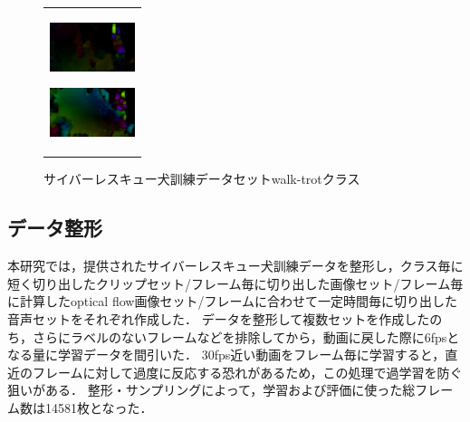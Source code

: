 \begin{enumerate}
\begin{end}
\begin{figure}[H]
\begin{tabular}{l}
\begin{minipage}{0.165\hsize}
\begin{center}
          \includegraphics[clip, width=2.5cm]{./Figures/optic_walk4.eps}
          \hspace{0.1cm} { }
        \end{center}
      \end{minipage}
      \begin{minipage}{0.165\hsize}
        \begin{center}
          \includegraphics[clip, width=2.5cm]{./Figures/optic_walk5.eps}
          \hspace{2.2cm} { }
        \end{center}
      \end{minipage}
\\ %
    \end{tabular}
    \caption{サイバーレスキュー犬訓練データセットwalk-trotクラス}
    \label{walk-trot}
\end{figure}


\subsection{データ整形}
本研究では，提供されたサイバーレスキュー犬訓練データを整形し，クラス毎に短く切り出したクリップセット/フレーム毎に切り出した画像セット/フレーム毎に計算したoptical flow画像セット/フレームに合わせて一定時間毎に切り出した音声セットをそれぞれ作成した．
データを整形して複数セットを作成したのち，さらにラベルのないフレームなどを排除してから，動画に戻した際に6fpsとなる量に学習データを間引いた．
30fps近い動画をフレーム毎に学習すると，直近のフレームに対して過度に反応する恐れがあるため，この処理で過学習を防ぐ狙いがある．
整形・サンプリングによって，学習および評価に使った総フレーム数は14581枚となった．

\end{end}
\end{enumerate}
